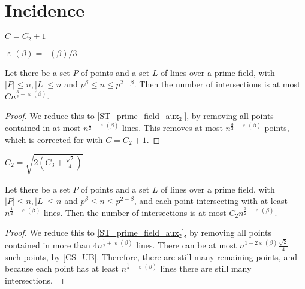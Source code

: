 \chapter{Incidence}
\label{chap:inc}

\DeclareMathOperator{\stpfone}{\varepsilon}
\DeclareMathOperator{\stpftwo}{\varepsilon_2}
\DeclareMathOperator{\sgone}{\varepsilon'}

\begin{definition}
    \label{ST_C}
    \leanok
    $C = C_2 + 1$
\end{definition}

\begin{definition}
    \leanok
    $\stpfone(\beta) = \stpftwo(\beta) / 3$
\end{definition}

\begin{theorem}
    \label{ST_prime_field}
    \leanok
    Let there be a set $P$ of points and a set $L$ of lines over a prime field, 
    with $|P| \leq n, |L| \leq n$ and $p^\beta \leq n \leq p^{2 - \beta}$.
    Then the number of intersections is at most $ C n^{\frac32 - \stpfone(\beta)} $.
\end{theorem}

\begin{proof}
    \leanok
    We reduce this to \ref{ST_prime_field_aux₂'}, by removing all points contained in at most
    $n^{\frac12 - \stpfone(\beta)}$ lines. This removes at most $n^{\frac32 - \stpfone(\beta)}$
    points, which is corrected for with $C = C_2 + 1$.
\end{proof}

\begin{definition}
    \label{ST_C2}
    \leanok
    $C_2 = \sqrt{2(C_3 + \frac{\sqrt2}4)}$
\end{definition}

\begin{theorem}
    \label{ST_prime_field_aux₂'}
    \leanok
    Let there be a set $P$ of points and a set $L$ of lines over a prime field, 
    with $|P| \leq n, |L| \leq n$ and $p^\beta \leq n \leq p^{2 - \beta}$,
    and each point intersecting with at least $n^{\frac12 - \stpfone(\beta)}$ lines.
    Then the number of intersections is at most $C_2 n^{\frac32 - \stpfone(\beta)}$.
\end{theorem}

\begin{proof}
    \leanok
    We reduce this to \ref{ST_prime_field_aux₂}, by removing all points contained in more than 
    $4 n^{\frac12 + \stpfone(\beta)}$ lines. There can be at most
    $n^{1 - 2 \stpfone(\beta)} \frac{\sqrt2}4$ such points, by \ref{CS_UB}.
    Therefore, there are still many remaining points, and because each point has at least
    $n^{\frac12 - \stpfone(\beta)}$ lines there are still many intersections.
\end{proof}

